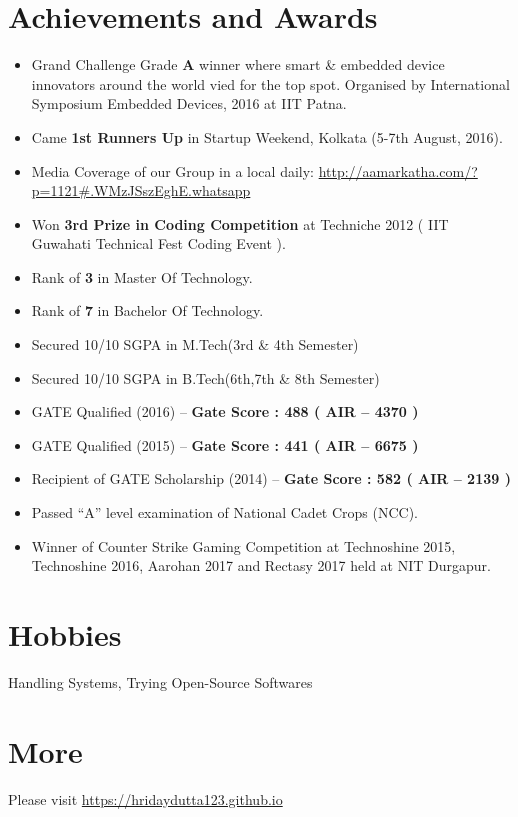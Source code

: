 \documentclass[margin, centered]{res}
\begin{document}
\begin{resume}
\section{Achievements and Awards}
\begin{itemize}[leftmargin=*]
 \item Grand Challenge Grade \textbf{A} winner where smart \& embedded device innovators around the world vied for the top spot. Organised by International Symposium Embedded Devices, 2016 at IIT Patna.
 \item Came \textbf{1st Runners Up} in Startup Weekend, Kolkata (5-7th August, 2016).
 \item Media Coverage of our Group in a local daily: \url{http://aamarkatha.com/?p=1121#.WMzJSszEghE.whatsapp}
 \item Won \textbf{3rd Prize in Coding Competition} at Techniche 2012 ( IIT Guwahati Technical Fest Coding Event ).
 \item Rank of \textbf{3} in Master Of Technology.
 \item Rank of \textbf{7} in Bachelor Of Technology.
 \item Secured 10/10 SGPA in M.Tech(3rd \& 4th Semester)
 \item Secured 10/10 SGPA in B.Tech(6th,7th \& 8th Semester)
 \item GATE Qualified (2016) – \textbf{Gate Score : 488 ( AIR – 4370 ) }
 \item GATE Qualified (2015) – \textbf{Gate Score : 441 ( AIR – 6675 ) }
 \item Recipient of GATE Scholarship (2014) – \textbf{Gate Score : 582 ( AIR – 2139 ) }
 \item Passed “A” level examination of National Cadet Crops (NCC).
 \item Winner of Counter Strike Gaming Competition at Technoshine 2015, Technoshine 2016, Aarohan 2017 and Rectasy 2017 held at NIT Durgapur.
\end{itemize}


\section{Hobbies}
Handling Systems, Trying Open-Source Softwares

\section{More}
Please visit \href{https://hridaydutta123.github.io}{https://hridaydutta123.github.io}

\end{resume}
\end{document}

